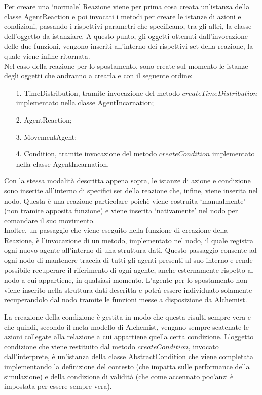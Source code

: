 Per creare una `normale' Reazione viene per prima cosa creata un'istanza della classe AgentReaction e poi invocati i metodi per creare le istanze di azioni e condizioni, passando i rispettivi parametri che specificano, tra gli altri, la classe dell'oggetto da istanziare. A questo punto, gli oggetti ottenuti dall'invocazione delle due funzioni, vengono inseriti all'interno dei rispettivi set della reazione, la quale viene infine ritornata.
\\
Nel caso della reazione per lo spostamento, sono create sul momento le istanze degli oggetti che andranno a crearla e con il seguente ordine:
\begin{itemize}
\item[1.] TimeDistribution, tramite invocazione del metodo $createTimeDistribution$ implementato nella classe AgentIncarnation;
\item[2.] AgentReaction;
\item[3.] MovementAgent;
\item[4.] Condition, tramite invocazione del metodo $createCondition$ implementato nella classe AgentIncarnation.
\end{itemize}
Con la stessa modalità descritta appena sopra, le istanze di azione e condizione sono inserite all'interno di specifici set della reazione che, infine, viene inserita nel nodo. Questa è una reazione particolare poichè viene costruita `manualmente' (non tramite apposita funzione) e viene inserita `nativamente' nel nodo per comandare il suo movimento.
\\
Inoltre, un passaggio che viene eseguito nella funzione di creazione della Reazione, è l'invocazione di un metodo, implementato nel nodo, il quale registra ogni nuovo agente all'interno di una struttura dati. Questo passaggio consente ad ogni nodo di mantenere traccia di tutti gli agenti presenti al suo interno e rende possibile recuperare il riferimento di ogni agente, anche esternamente rispetto al nodo a cui appartiene, in qualsiasi momento.
L'agente per lo spostamento non viene inserito nella struttura dati descritta e potrà essere individuato solamente recuperandolo dal nodo tramite le funzioni messe a disposizione da Alchemist.

La creazione della condizione è gestita in modo che questa risulti sempre vera e che quindi, secondo il meta-modello di Alchemist, vengano sempre scatenate le azioni collegate alla relazione a cui appartiene quella certa condizione. L'oggetto condizione che viene restituito dal metodo $createCondition$, invocato dall'interprete, è un'istanza della classe AbstractCondition che viene completata implementando la definizione del contesto (che impatta sulle performance della simulazione) e della condizione di validità (che come accennato poc'anzi è impostata per essere sempre vera).

